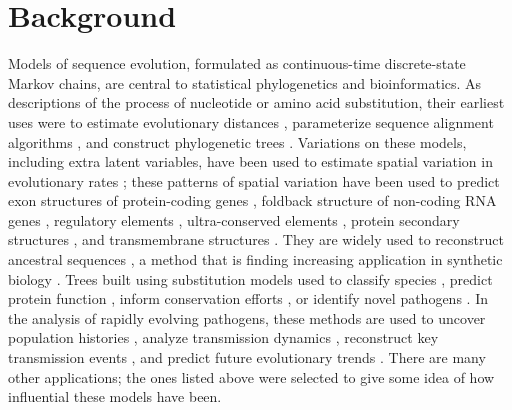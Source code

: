 \documentclass{bmcart}
\begin{document}
\begin{frontmatter}
\begin{abstractbox}
\begin{keyword}
\end{keyword}


\end{abstractbox}
%

\end{frontmatter}

\section*{Background}

Models of sequence evolution, formulated as continuous-time discrete-state Markov chains,
are central to statistical phylogenetics and bioinformatics.
As descriptions of the process of nucleotide or amino acid substitution,
their earliest uses were to estimate evolutionary distances \cite{JukesCantor69},
parameterize sequence alignment algorithms \cite{DayhoffEtal72},
and construct phylogenetic trees \cite{Felsenstein81}.
Variations on these models, including extra latent variables,
have been used to estimate spatial variation in evolutionary rates \cite{Yang93,Yang94};
these patterns of spatial variation have been used to
predict exon structures of protein-coding genes \cite{PedersenHein2003,SiepelHaussler04b},
foldback structure of non-coding RNA genes \cite{PedersenEtAl2006,PollardEtAl2006},
regulatory elements \cite{PedersenEtAl04},
ultra-conserved elements \cite{SiepelEtAl2005},
protein secondary structures \cite{GoldmanEtAl96},
and transmembrane structures \cite{LioGoldman99}.
They are widely used to reconstruct ancestral sequences \cite{BlanchetteEtAl2004,UgaldeEtAl2004,Liberles2007,OrtlundEtAl2007,GaucherEtAl2008,AshkenazyEtAl2012,AlcolombriEtAl2011,SantiagoOrtizEtAl2015,ZakasEtAl2016},
a method that is finding increasing application in synthetic biology \cite{Liberles2007,AlcolombriEtAl2011,SantiagoOrtizEtAl2015,ZakasEtAl2016}.
Trees built using substitution models used to classify species \cite{pmid26385966},
predict protein function \cite{EngelhardtEtAl2005},
inform conservation efforts \cite{pmid25561668},
or identify novel pathogens \cite{pmid12690091}.
In the analysis of rapidly evolving pathogens, these methods are used to
uncover population histories \cite{pmid15703244},
analyze transmission dynamics \cite{pmid22927414},
reconstruct key transmission events \cite{pmid27783600},
and predict future evolutionary trends \cite{pmid27774306}.
There are many other applications;
the ones listed above were selected to give some idea of how influential these models have been.
\end{document}
